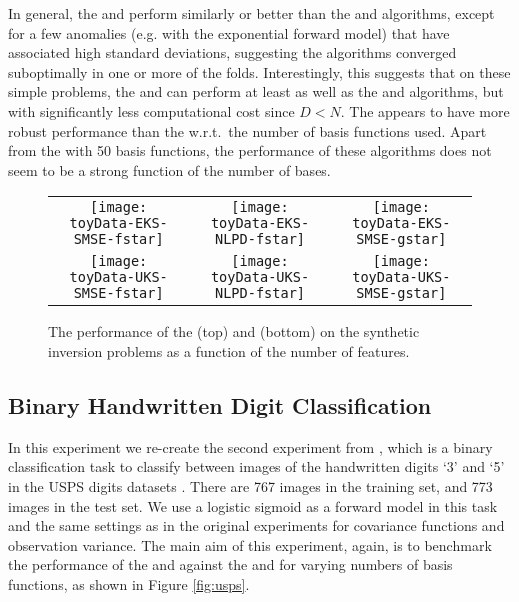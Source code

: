 In general, the \eks and \uks perform similarly or better than the \egp and
\ugp algorithms, except for a few anomalies (e.g. \egp with the exponential
forward model) that have associated high standard deviations, suggesting the
algorithms converged suboptimally in one or more of the folds. Interestingly,
this suggests that on these simple problems, the \eks and \uks can perform at
least as well as the \egp and \ugp algorithms, but with significantly less
computational cost since $D < N$. The \eks appears to have more robust
performance than the \uks w.r.t.\ the number of basis functions used. Apart
from the \uks with 50 basis functions, the performance of these algorithms does
not seem to be a strong function of the number of bases. 

\begin{figure*}
\centering
\begin{tabular}{c c c}
\texttt{[image: toyData-EKS-SMSE-fstar]} &
\texttt{[image: toyData-EKS-NLPD-fstar]} &
\texttt{[image: toyData-EKS-SMSE-gstar]} \\
\texttt{[image: toyData-UKS-SMSE-fstar]} &
\texttt{[image: toyData-UKS-NLPD-fstar]} &
\texttt{[image: toyData-UKS-SMSE-gstar]} \\
\end{tabular}
\caption{The performance of the \eks (top) and \uks (bottom)
on the synthetic inversion problems as a function of the number of features. 
\label{fig:toyinversions}
}
\end{figure*} 
%
\subsection{Binary Handwritten Digit Classification}
In this experiment we re-create the second experiment from
\citet{steinberg-bonilla-nips-2014}, which is a binary classification task to
classify between images of the handwritten digits `3' and `5' in the USPS
digits datasets \cite{rasmussen-williams-book}. There are 767 images in the
training set, and 773 images in the test set. We use a logistic sigmoid as a
forward model in this task and the same settings as in the original
    experiments for covariance functions and observation variance. The main
aim of this experiment, again, is to benchmark the performance of the \eks and
\uks against the \egp and \ugp for varying numbers of basis functions, as shown
in Figure \ref{fig:usps}. 


